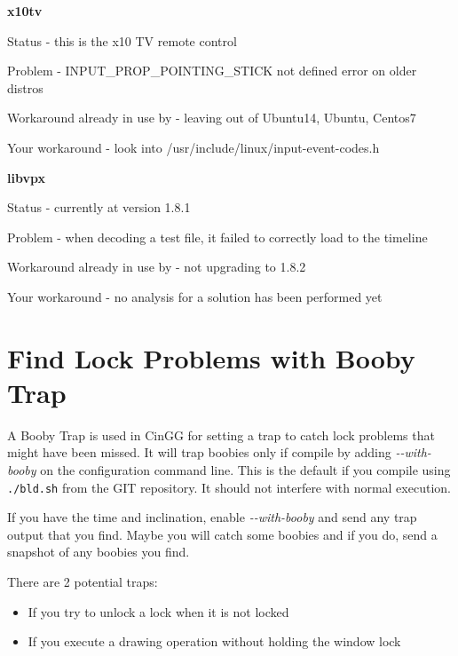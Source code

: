 \textbf{x10tv}
\begin{description}[noitemsep]
     \item Status - this is the x10 TV remote control
     \item Problem - INPUT\_PROP\_POINTING\_STICK not defined error on older distros
     \item Workaround already in use by \CGG{} - leaving out of Ubuntu14, Ubuntu, Centos7
     \item Your workaround - look into /usr/include/linux/input-event-codes.h
\end{description}

\textbf{libvpx}
\begin{description}[noitemsep]
     \item Status - currently at version 1.8.1
     \item Problem - when decoding a test file, it failed to correctly load to the timeline
     \item Workaround already in use by \CGG{} - not upgrading to 1.8.2
     \item Your workaround - no analysis for a solution has been performed yet
\end{description}

\section{Find Lock Problems with Booby Trap}
\label{sec:find_lock_problems_booby_trap}

A Booby Trap is used in CinGG for setting a trap to catch lock problems that might have been missed. It will trap boobies only if compile by adding \textit{-{}-with-booby} on the configuration command line. This is the default if you compile using \texttt{./bld.sh} from the GIT repository. It should not interfere with normal execution.

If you have the time and inclination, enable \textit{-{}-with-booby} and send any trap output that you find. Maybe you will catch some boobies and if you do, send a snapshot of any boobies you find.

There are 2 potential traps:

\begin{itemize}[nosep]
	\item If you try to unlock a lock when it is not locked
	\item If you execute a drawing operation without holding the window lock
\end{itemize}


